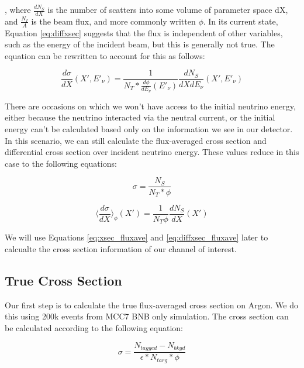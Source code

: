 \documentclass[12pt]{article}
\begin{document}
, where $\frac{dN_S}{dX}$ is the number of scatters into some volume of parameter space dX, and $\frac{N_I}{A}$ is the beam flux, and more commonly written $\phi$. In its current state, Equation \ref{eq:diffxsec} suggests that the flux is independent of other variables, such as the energy of the incident beam, but this is generally not true. The equation can be rewritten to account for this as follows:

\begin{equation}
\frac{d\sigma}{dX}(X',E'_\nu) = \frac{1}{N_T*\frac{d\phi}{dE_\nu}(E'_\nu)}\frac{dN_S}{dXdE_\nu}(X',E'_\nu)
\label{eq:diffxsec_edep}
\end{equation}

There are occasions on which we won't have access to the initial neutrino energy, either because the neutrino interacted via the neutral current, or the initial energy can't be calculated based only on the information we see in our detector. In this scenario, we can still calculate the flux-averaged cross section and differential cross section over incident neutrino energy. These values reduce in this case to the following equations:

\begin{equation}
\sigma = \frac{N_S}{N_T * \phi}
\label{eq:xsec_fluxave}
\end{equation}

\begin{equation}
\Big \langle \frac{d\sigma}{dX} \Big \rangle_\phi(X') = \frac{1}{N_T\phi}\frac{dN_S}{dX}(X')
\label{eq:diffxsec_fluxave}
\end{equation}

We will use Equations \ref{eq:xsec_fluxave} and \ref{eq:diffxsec_fluxave} later to calcualte the cross section information of our channel of interest.

\subsection{True Cross Section}
Our first step is to calculate the true flux-averaged cross section on Argon. We do this using 200k events from MCC7 BNB only simulation.  The cross section can be calculated according to the following equation:

\begin{equation}
  \sigma = \frac{N_{tagged} - N_{bkgd}}{\epsilon*N_{targ}*\phi}
\end{equation}
\end{document}
